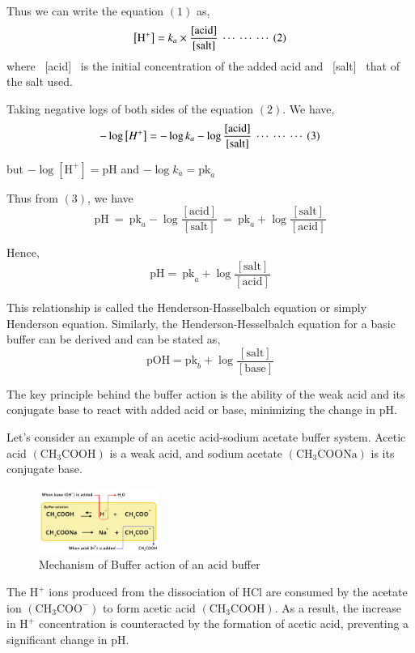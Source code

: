 \documentclass[12pt]{article}
\begin{document}
Thus we can write the equation $(1)$ as,
$$
\left[\mathrm{H}^{+}\right]=k_a \times \frac{[\text{acid}]}{[\text{salt}]} \ \cdots \ \cdots \ \cdots \ (2)
$$
where \ [acid] \ is the initial concentration of the added acid and \ [salt] \ that of the salt used.

Taking negative logs of both sides of the equation $(2)$. We have,
$$
-\log \left[H^{+}\right]=-\log k_a-\log \frac{[\text{acid}]}{[\text{salt}]} \ \cdots \ \cdots \ \cdots \ (3)
$$

but $-\log \left[\mathrm{H}^{+}\right]=\mathrm{pH}$ \tab and \tab $-\log k_a=\mathrm{pk}_a$

Thus from $(3)$, we have
$$
\mathrm{pH} \ = \ \mathrm{pk}_a-\log \frac{[\text{acid}]}{[\text{salt}]} \ = \ \mathrm{pk}_a+\log \frac{[\text{salt}]}{[\text{acid}]}
$$

Hence,
$$
\mathrm{pH} = \ \mathrm{pk}_a+\log \frac{[\text{salt}]}{[\text{acid}]}
$$

This relationship is called the Henderson-Hasselbalch equation or simply Henderson equation.
Similarly, the Henderson-Hesselbalch equation for a basic buffer can be derived and can be stated as,
$$
\mathrm{pOH}=\mathrm{pk}_b+\log \frac{[\text{salt}]}{[\text{base}]}
$$




The key principle behind the buffer action is the ability of the weak acid and its conjugate base to react with added acid or base, minimizing the change in pH.

Let's consider an example of an acetic acid-sodium acetate buffer system. Acetic acid $\mathrm{(CH_3COOH)}$ is a weak acid, and sodium acetate $\mathrm{(CH_3COONa)}$ is its conjugate base.

\begin{figure}[h]
   \centering
   \includegraphics[width=0.35\textwidth]{Figures/Buffer.jpg}
   \caption{Mechanism of Buffer action of an acid buffer}
\end{figure}

\vspace{-\baselineskip}
The  $\mathrm{H}^{+}$ ions produced from the dissociation of $\mathrm{HCl}$ are consumed by the acetate ion $\mathrm{(CH_3COO^-)}$ to form acetic acid $\mathrm{(CH_3COOH)}$. As a result, the increase in  $\mathrm{H}^{+}$ concentration is counteracted by the formation of acetic acid, preventing a significant change in pH.
\end{document}
